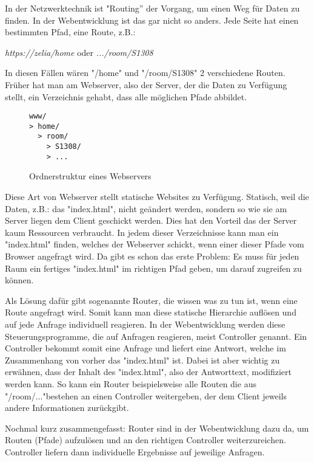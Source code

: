 \label{sec:csrouter}


In der Netzwerktechnik ist "Routing” der Vorgang, um einen Weg für Daten zu finden. In der Webentwicklung ist das gar nicht so anders. Jede Seite hat einen bestimmten Pfad, eine Route, z.B.:

\emph{https://zelia/home} oder \emph{.../room/S1308}

In diesen Fällen wären "/home" und "/room/S1308" 2 verschiedene Routen. Früher hat man am Webserver, also der Server, der die Daten zu Verfügung stellt, ein Verzeichnis gehabt, dass alle möglichen Pfade abbildet.

\begin{figure}[H]
    \begin{lstlisting}
www/
> home/
  > room/
    > S1308/
    > ...
    \end{lstlisting}
    \caption{Ordnerstruktur eines Webservers}
\end{figure}

Diese Art von Webserver stellt statische Websites zu Verfügung. Statisch, weil die Daten, z.B.: das "index.html", nicht geändert werden, sondern so wie sie am Server liegen dem Client geschickt werden. Dies hat den Vorteil das der Server kaum Ressourcen verbraucht. In jedem dieser Verzeichnisse kann man ein "index.html" finden, welches der Webserver schickt, wenn einer dieser Pfade vom Browser angefragt wird. Da gibt es schon das erste Problem: Es muss für jeden Raum ein fertiges "index.html" im richtigen Pfad geben, um darauf zugreifen zu können.

Als Lösung dafür gibt sogenannte Router, die wissen was zu tun ist, wenn eine Route angefragt wird. Somit kann man diese statische Hierarchie auflösen und auf jede Anfrage individuell reagieren. In der Webentwicklung werden diese Steuerungsprogramme, die auf Anfragen reagieren, meist Controller genannt. Ein Controller bekommt somit eine Anfrage und liefert eine Antwort, welche im Zusammenhang von vorher das "index.html" ist. Dabei ist aber wichtig zu erwähnen, dass der Inhalt des "index.html", also der Antworttext, modifiziert werden kann. So kann ein Router beispielsweise alle Routen die aus "/room/..."bestehen an einen Controller weitergeben, der dem Client jeweils andere Informationen zurückgibt.

Nochmal kurz zusammengefasst: Router sind in der Webentwicklung dazu da, um Routen (Pfade) aufzulösen und an den richtigen Controller weiterzureichen. Controller liefern dann individuelle Ergebnisse auf jeweilige Anfragen.

